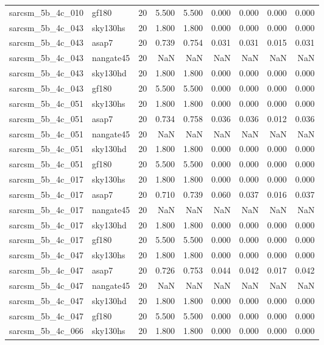 \begin{tabular}{llrrrrrrr}
sarcsm\_5b\_4c\_010 & gf180 & 20 & 5.500 & 5.500 & 0.000 & 0.000 & 0.000 & 0.000 \\
sarcsm\_5b\_4c\_043 & sky130hs & 20 & 1.800 & 1.800 & 0.000 & 0.000 & 0.000 & 0.000 \\
sarcsm\_5b\_4c\_043 & asap7 & 20 & 0.739 & 0.754 & 0.031 & 0.031 & 0.015 & 0.031 \\
sarcsm\_5b\_4c\_043 & nangate45 & 20 & NaN & NaN & NaN & NaN & NaN & NaN \\
sarcsm\_5b\_4c\_043 & sky130hd & 20 & 1.800 & 1.800 & 0.000 & 0.000 & 0.000 & 0.000 \\
sarcsm\_5b\_4c\_043 & gf180 & 20 & 5.500 & 5.500 & 0.000 & 0.000 & 0.000 & 0.000 \\
sarcsm\_5b\_4c\_051 & sky130hs & 20 & 1.800 & 1.800 & 0.000 & 0.000 & 0.000 & 0.000 \\
sarcsm\_5b\_4c\_051 & asap7 & 20 & 0.734 & 0.758 & 0.036 & 0.036 & 0.012 & 0.036 \\
sarcsm\_5b\_4c\_051 & nangate45 & 20 & NaN & NaN & NaN & NaN & NaN & NaN \\
sarcsm\_5b\_4c\_051 & sky130hd & 20 & 1.800 & 1.800 & 0.000 & 0.000 & 0.000 & 0.000 \\
sarcsm\_5b\_4c\_051 & gf180 & 20 & 5.500 & 5.500 & 0.000 & 0.000 & 0.000 & 0.000 \\
sarcsm\_5b\_4c\_017 & sky130hs & 20 & 1.800 & 1.800 & 0.000 & 0.000 & 0.000 & 0.000 \\
sarcsm\_5b\_4c\_017 & asap7 & 20 & 0.710 & 0.739 & 0.060 & 0.037 & 0.016 & 0.037 \\
sarcsm\_5b\_4c\_017 & nangate45 & 20 & NaN & NaN & NaN & NaN & NaN & NaN \\
sarcsm\_5b\_4c\_017 & sky130hd & 20 & 1.800 & 1.800 & 0.000 & 0.000 & 0.000 & 0.000 \\
sarcsm\_5b\_4c\_017 & gf180 & 20 & 5.500 & 5.500 & 0.000 & 0.000 & 0.000 & 0.000 \\
sarcsm\_5b\_4c\_047 & sky130hs & 20 & 1.800 & 1.800 & 0.000 & 0.000 & 0.000 & 0.000 \\
sarcsm\_5b\_4c\_047 & asap7 & 20 & 0.726 & 0.753 & 0.044 & 0.042 & 0.017 & 0.042 \\
sarcsm\_5b\_4c\_047 & nangate45 & 20 & NaN & NaN & NaN & NaN & NaN & NaN \\
sarcsm\_5b\_4c\_047 & sky130hd & 20 & 1.800 & 1.800 & 0.000 & 0.000 & 0.000 & 0.000 \\
sarcsm\_5b\_4c\_047 & gf180 & 20 & 5.500 & 5.500 & 0.000 & 0.000 & 0.000 & 0.000 \\
sarcsm\_5b\_4c\_066 & sky130hs & 20 & 1.800 & 1.800 & 0.000 & 0.000 & 0.000 & 0.000 \\

\end{tabular}
